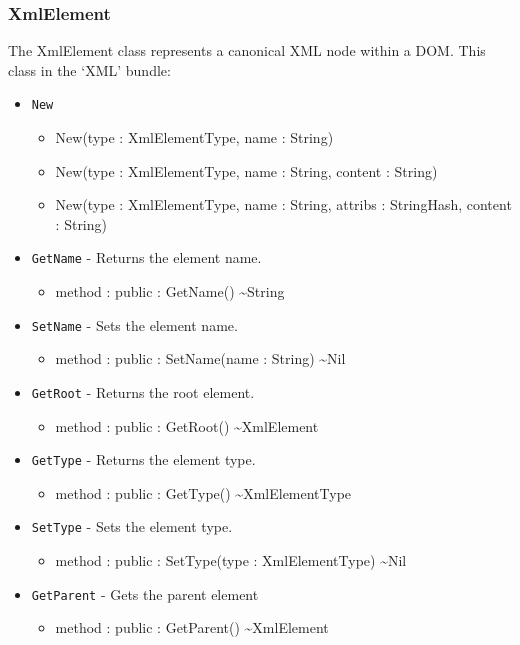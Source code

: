 \documentclass[11pt]{article}
\begin{document}
\subsubsection{XmlElement}
The XmlElement class represents a canonical XML node within a
DOM. This class in the `XML' bundle:
\begin{itemize}
\item \texttt{New}
  \begin{itemize}
  \item New(type : XmlElementType, name : String)
  \item New(type : XmlElementType, name : String, content : String)
  \item New(type : XmlElementType, name : String, attribs :
    StringHash, content : String)
  \end{itemize}
\item \texttt{GetName} - Returns the element name.
  \begin{itemize}
  \item method : public : GetName() \textasciitilde String
  \end{itemize}
\item \texttt{SetName} - Sets the element name.
  \begin{itemize}
  \item method : public : SetName(name : String) \textasciitilde Nil
  \end{itemize}
\item \texttt{GetRoot} - Returns the root element.
  \begin{itemize}
  \item method : public : GetRoot() \textasciitilde XmlElement
  \end{itemize}
\item \texttt{GetType} - Returns the element type.
  \begin{itemize}
  \item method : public : GetType() \textasciitilde XmlElementType
  \end{itemize}
\item \texttt{SetType} - Sets the element type.
  \begin{itemize}
  \item method : public : SetType(type : XmlElementType) \textasciitilde Nil
  \end{itemize}
\item \texttt{GetParent} - Gets the parent element
  \begin{itemize}
  \item method : public : GetParent() \textasciitilde XmlElement

\end{itemize}
\end{itemize}
\end{document}
